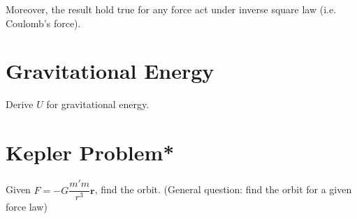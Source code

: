 \documentclass[11pt, a4paper, oneside]{book}
\numberwithin{equation}{section}%
\begin{document}
Moreover, the result hold true for any force act under inverse square law (i.e. Coulomb's force).









\section{Gravitational Energy}
Derive $U$ for gravitational energy.


\section{Kepler Problem*}
Given $F=-G\dfrac{m'm}{r^3}\textbf{r}$, find the orbit. (General question: find the orbit for a given force law)
\end{document}

